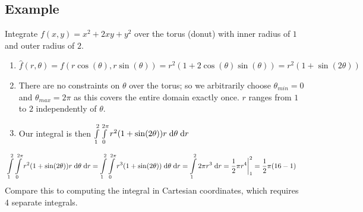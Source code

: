 \documentclass[letterpaper,11pt]{article}
\begin{document}
\subsection*{Example}
Integrate $f(x, y) = x^2 + 2 x y + y^2$ over the torus (donut) with inner radius of $1$ and outer radius of $2$.

\begin{enumerate}
  \item $\hat{f}(r, \theta) = f(r \cos(\theta), r \sin(\theta)) = r^2 ( 1 + 2 \cos(\theta) \sin(\theta) ) = r^2 (1 + \sin(2 \theta))$
  \item There are no constraints on $\theta$ over the torus; so we arbitrarily choose $\theta_{min} = 0$ and $\theta_{max} = 2 \pi$ as this covers the entire domain exactly once.
    $r$ ranges from $1$ to $2$ independently of $\theta$.
  \item Our integral is then $\int \limits_{1}^{2} \int \limits_{0}^{2 \pi} r^2 (1 + \sin(2 \theta)) r \;\mathrm{d}\theta \;\mathrm{d}r$
\end{enumerate}
\begin{align*}
  & \int \limits_{1}^{2} \int \limits_{0}^{2 \pi} r^2 (1 + \sin(2 \theta)) r \;\mathrm{d}\theta \;\mathrm{d}r
    = \int \limits_{1}^{2} \int \limits_{0}^{2 \pi} r^3 (1 + \sin(2 \theta)) \;\mathrm{d}\theta \;\mathrm{d}r
    = \int \limits_{1}^{2} 2 \pi r^3 \;\mathrm{d}r
    = \frac{1}{2} \pi r^4 \bigg \rvert_{1}^{2}
    = \frac{1}{2} \pi (16 - 1)
\end{align*}
Compare this to computing the integral in Cartesian coordinates, which requires 4 separate integrals.
\end{document}
